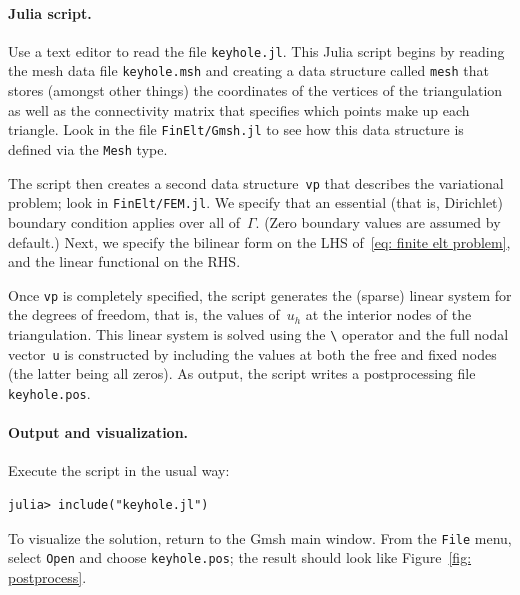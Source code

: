\documentclass[a4paper,12pt]{article}
\begin{document}
\paragraph{Julia script.}
Use a text editor to read the file \verb!keyhole.jl!.  This 
Julia script begins by reading the mesh data file \verb!keyhole.msh! 
and creating a data structure called \verb!mesh! that stores (amongst 
other things) the coordinates of the vertices of the triangulation as 
well as the connectivity matrix that specifies which points make up 
each triangle.  Look in the file
\verb!FinElt/Gmsh.jl! to see how this data structure is defined via 
the \verb!Mesh! type.  

The script then creates a second data structure~\verb!vp! that 
describes the variational problem; look in \verb!FinElt/FEM.jl!.  We 
specify that an essential (that is, Dirichlet) boundary condition 
applies over all of~$\Gamma$.  (Zero boundary values are assumed by 
default.)  Next, we specify the bilinear form on the LHS 
of~\eqref{eq: finite elt problem}, and the linear functional on the 
RHS.

Once \verb!vp! is completely specified, the script generates the 
(sparse) linear system for the degrees of freedom, that is, the 
values of~$u_h$ at the interior nodes of the triangulation.  This 
linear system is solved using the \verb!\! operator and the full 
nodal vector~\verb!u! is constructed by including the values at both 
the free and fixed nodes (the latter being all zeros).  As output, 
the script writes a postprocessing file \verb!keyhole.pos!.

\paragraph{Output and visualization.}
Execute the script in the usual way:
\begin{verbatim}
julia> include("keyhole.jl")
\end{verbatim}
To visualize the solution, return to the Gmsh main window.  From 
the \verb!File! menu, select \verb!Open! and choose 
\verb!keyhole.pos!; the result should look like 
Figure~\ref{fig: postprocess}.  
\end{document}
